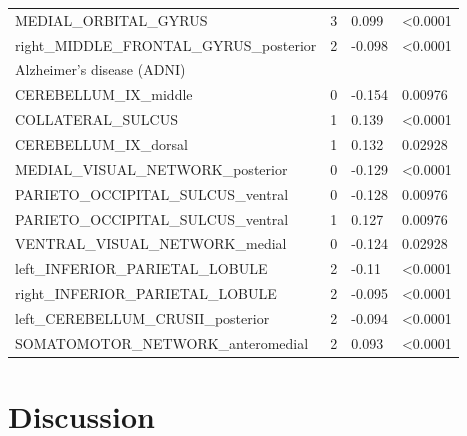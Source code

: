 \documentclass{article}
\begin{document}
\begin{tabular}{p{}p{}p{}p{}}
MEDIAL\_ORBITAL\_GYRUS & 3 & 0.099 & \textless 0.0001 \\
right\_MIDDLE\_FRONTAL\_GYRUS\_posterior & 2 & -0.098 & \textless 0.0001 \\
\newline
 Alzheimer's disease (ADNI) &  &  &  \\
CEREBELLUM\_IX\_middle & 0 & -0.154 & 0.00976 \\
COLLATERAL\_SULCUS & 1 & 0.139 & \textless 0.0001 \\
CEREBELLUM\_IX\_dorsal & 1 & 0.132 & 0.02928 \\
MEDIAL\_VISUAL\_NETWORK\_posterior & 0 & -0.129 & \textless 0.0001 \\
PARIETO\_OCCIPITAL\_SULCUS\_ventral & 0 & -0.128 & 0.00976 \\
PARIETO\_OCCIPITAL\_SULCUS\_ventral & 1 & 0.127 & 0.00976 \\
VENTRAL\_VISUAL\_NETWORK\_medial & 0 & -0.124 & 0.02928 \\
left\_INFERIOR\_PARIETAL\_LOBULE & 2 & -0.11 & \textless 0.0001 \\
right\_INFERIOR\_PARIETAL\_LOBULE & 2 & -0.095 & \textless 0.0001 \\
left\_CEREBELLUM\_CRUSII\_posterior & 2 & -0.094 & \textless 0.0001 \\
SOMATOMOTOR\_NETWORK\_anteromedial & 2 & 0.093 & \textless 0.0001 \\
\bottomrule
\end{tabular}

\section{\textbf{Discussion}}\label{Discussion}
\end{document}
